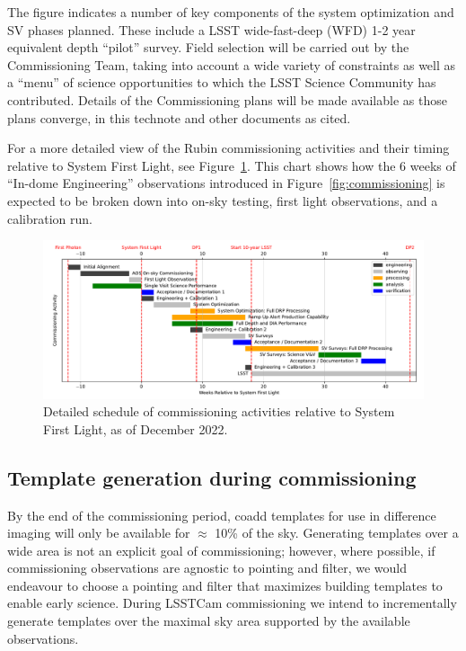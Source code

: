 The figure indicates a number of key components of the system optimization and SV phases planned.
These include a LSST wide-fast-deep (WFD) 1-2 year equivalent depth ``pilot'' survey.
Field selection will be carried out by the Commissioning Team, taking into account a wide variety of constraints as well as a ``menu'' of science opportunities to which the LSST Science Community has contributed.
Details of the Commissioning plans will be made available as those plans converge, in this technote and other documents as cited.

For a more detailed view of the Rubin commissioning activities and their timing relative to System First Light, see Figure~\ref{fig:commissioning-gantt}.
This chart shows how the 6 weeks of ``In-dome Engineering'' observations introduced in Figure~\ref{fig:commissioning} is expected to be broken down into on-sky testing, first light observations, and a calibration run.

\begin{figure}
\includegraphics[width=\linewidth]{figures/rubinobs_on-sky_commissioning_gantt.pdf}
\caption{Detailed schedule of commissioning activities relative to System First Light, as of December 2022.}
\label{fig:commissioning-gantt}
\end{figure}


\subsection{Template generation during commissioning}

By the end of the commissioning period, coadd templates for use in difference imaging will only be available for $\approx$ 10\% of the sky.
Generating templates over a wide area is not an explicit goal of commissioning;  however, where possible, if commissioning observations are agnostic to pointing and filter, we would endeavour to choose a pointing and filter that maximizes building templates to enable early science.
During LSSTCam commissioning we intend to incrementally generate templates over the maximal sky area supported by the available observations.

